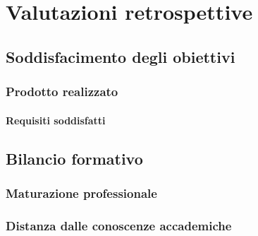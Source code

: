 
\chapter{Valutazioni retrospettive}
\label{cap:analisi-requisiti}

\section{Soddisfacimento degli obiettivi}

\subsection{Prodotto realizzato}

\subsubsection{Requisiti soddisfatti}


\section{Bilancio formativo}

\subsection{Maturazione professionale}

\subsection{Distanza dalle conoscenze accademiche}

